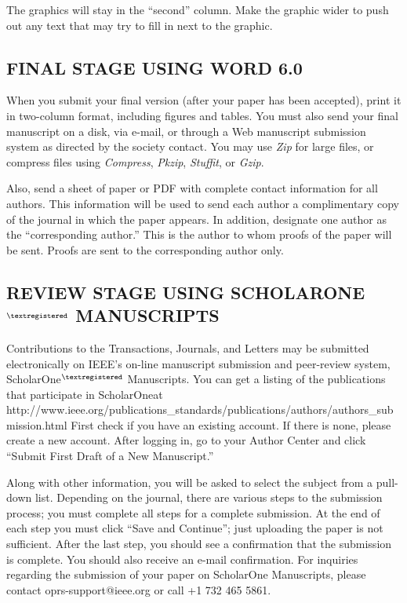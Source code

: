 \documentclass{IEEEojcsys}
\begin{document}
The graphics will stay in the ``second'' column. Make the graphic wider to push out any text that may try to fill in next to the graphic.

\subsection{FINAL STAGE USING WORD 6.0}

When you submit your final version (after your paper has been accepted), print it in two-column format, including figures and tables. You must also send your final manuscript on a disk, via e-mail, or through a Web manuscript submission system as directed by the society contact. You may use {\it Zip} for large files, or compress files using {\it Compress}, {\it Pkzip}, {\it Stuffit}, or {\it Gzip}. 

Also, send a sheet of paper or PDF with complete contact information for all authors. This information will be used to send each author a complimentary copy of the journal in which the paper appears. In addition, designate one author as the ``corresponding author.'' This is the author to whom proofs of the paper will be sent. Proofs are sent to the corresponding author only.

\subsection{REVIEW STAGE USING SCHOLARONE$^{\scriptsize\textregistered}$ MANUSCRIPTS}

Contributions to the Transactions, Journals, and Letters may be submitted electronically on IEEE's on-line manuscript submission and peer-review system, ScholarOne$^{\scriptsize\textregistered}$ Manuscripts. You can get a listing of the publications that participate in ScholarOne\break at http://www.ieee.org/publications\_standards/publications/\break authors/authors\_submission.html First check if you have an existing account. If there is none, please create a new account. After logging in, go to your Author Center and click ``Submit First Draft of a New Manuscript.'' 



Along with other information, you will be asked to select the subject from a pull-down list. Depending on the journal, there are various steps to the submission process; you must complete all steps for a complete submission. At the end of each step you must click ``Save and Continue''; just uploading the paper is not sufficient. After the last step, you should see a confirmation that the submission is complete. You should also receive an e-mail confirmation. For inquiries regarding the submission of your paper on ScholarOne Manuscripts, please contact oprs-support@ieee.org or call +1 732 465 5861.
\end{document}
